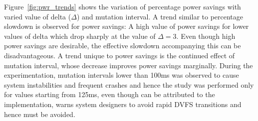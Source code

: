 Figure~\ref{fig:pwr_trends} shows the variation of percentage power savings with varied value 
of delta ($\Delta$) and mutation interval. A trend similar to percentage slowdown is observed
for power savings: A high value of power savings for lower values of delta which drop sharply 
at the value of $\Delta = 3$. Even though high power savings are desirable, the effective 
slowdown accompanying this can be disadvantageous. A trend unique to power savings is the 
continued effect of mutation interval, whose decrease improves power savings marginally.
During the experimentation, mutation intervals lower than 100ms was observed to cause system
instabilities and frequent crashes and hence the study was performed only for values starting
from 125ms, even though can be attributed to the implementation, \cite{ImpactDVFS} warns 
system designers to avoid rapid DVFS transitions and hence must be avoided.


